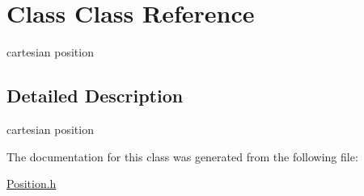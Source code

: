 \hypertarget{class_class}{\section{Class Class Reference}
\label{class_class}
}


cartesian position  




\subsection{Detailed Description}
cartesian position 

The documentation for this class was generated from the following file\+:\begin{DoxyCompactItemize}
\item 
\hyperlink{_position_8h}{Position.\+h}\end{DoxyCompactItemize}

